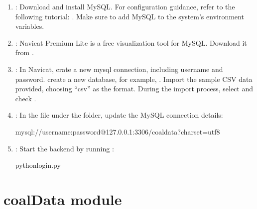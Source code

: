 \documentclass[a4paper,12pt,english]{sphinxmanual}
\begin{document}
\begin{enumerate}
%
\setcounter{enumi}{1}
\item {} 
\sphinxAtStartPar
{}:
Download and install MySQL. For configuration guidance, refer to the following tutorial: . Make sure to add MySQL to the system’s environment variables.

\item {} 
\sphinxAtStartPar
{}:
Navicat Premium Lite is a free visualization tool for MySQL. Download it from .

\item {} 
\sphinxAtStartPar
{}:
\sphinxhyphen{} In Navicat, crate a new mysql connection, including username and password. create a new database, for example, .
\sphinxhyphen{} Import the sample CSV data provided, choosing “csv” as the format.
\sphinxhyphen{} During the import process, select  and check .

\item {} 
\sphinxAtStartPar
{}:
In the  file under the  folder, update the MySQL connection details:

\begin{sphinxVerbatim}[commandchars=\\\{\}]
mysql://\PYGZlt{}username\PYGZgt{}:\PYGZlt{}password\PYGZgt{}@127.0.0.1:3306/coaldata?charset=utf8
\end{sphinxVerbatim}

\item {} 
\sphinxAtStartPar
{}:
Start the back\sphinxhyphen{}end by running :

\begin{sphinxVerbatim}[commandchars=\\\{\}]
pythonlogin.py
\end{sphinxVerbatim}

\end{enumerate}

\sphinxstepscope


\chapter{coalData module}
\label{\detokenize{api/coalData:module-coalData}}\label{\detokenize{api/coalData:coaldata-module}}\label{\detokenize{api/coalData::doc}}
\end{document}
